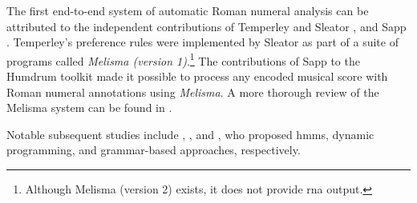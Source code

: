 

The first end-to-end system of automatic Roman numeral
analysis can be attributed to the independent contributions
of Temperley and Sleator \parencite{temperley2004cognition},
and Sapp \parencite{sapp2009tsroot}. Temperley's preference
rules were implemented by Sleator as part of a suite of
programs called \emph{Melisma (version
1)}.\footnote{Although Melisma (version 2) exists, it does
not provide \gls{rna} output.} The contributions of Sapp to
the Humdrum toolkit \parencite{huron2002music} made it
possible to process any encoded musical score with Roman
numeral annotations using \emph{Melisma}. A more thorough
review of the Melisma system can be found in
\textcite{napoleslopez2017automatic}.

Notable subsequent studies include
\textcite{raphael2004functional},
\textcite{illescas2007harmonic}, and
\textcite{magalhaes2011functional}, who proposed
\glspl{hmm}, dynamic programming, and grammar-based
approaches, respectively.

